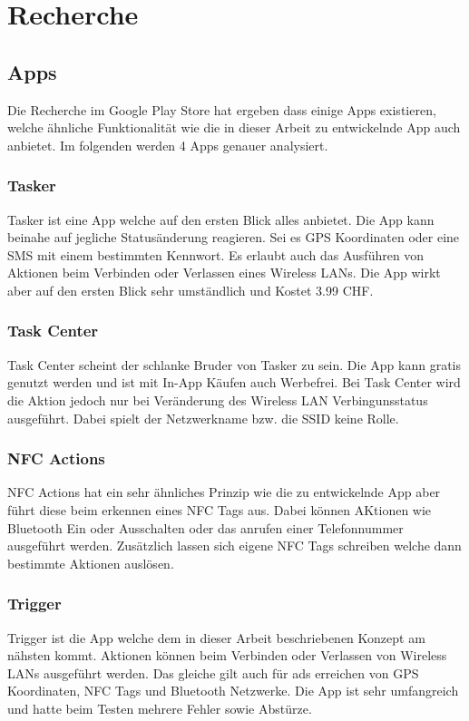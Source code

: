 \chapter{Recherche}
\label{sec:recherche}

\section{Apps}
Die Recherche im Google Play Store hat ergeben dass einige Apps existieren, welche ähnliche Funktionalität wie die in dieser Arbeit zu entwickelnde App auch anbietet. Im folgenden werden 4 Apps genauer analysiert.

\subsection{Tasker}
Tasker\citep{google.play.tasker} ist eine App welche auf den ersten Blick alles anbietet. Die App kann beinahe auf jegliche Statusänderung reagieren. Sei es GPS Koordinaten oder eine SMS mit einem bestimmten Kennwort. Es erlaubt auch das Ausführen von Aktionen beim Verbinden oder Verlassen eines Wireless LANs. Die App wirkt aber auf den ersten Blick sehr umständlich und Kostet 3.99 CHF.

\subsection{Task Center}
Task Center\citep{google.play.taskcenter} scheint der schlanke Bruder von Tasker zu sein. Die App kann gratis genutzt werden und ist mit In-App Käufen auch Werbefrei. Bei Task Center wird die Aktion jedoch nur bei Veränderung des Wireless LAN Verbingunsstatus ausgeführt. Dabei spielt der Netzwerkname bzw. die SSID keine Rolle.

\subsection{NFC Actions}
NFC Actions\citep{google.play.nfcactions} hat ein sehr ähnliches Prinzip wie die zu entwickelnde App aber führt diese beim erkennen eines NFC Tags aus. Dabei können AKtionen wie Bluetooth Ein oder Ausschalten oder das anrufen einer Telefonnummer ausgeführt werden. Zusätzlich lassen sich eigene NFC Tags schreiben welche dann bestimmte Aktionen auslösen.

\subsection{Trigger}
Trigger\citep{google.play.trigger} ist die App welche dem in dieser Arbeit beschriebenen Konzept am nähsten kommt. Aktionen können beim Verbinden oder Verlassen von Wireless LANs ausgeführt werden. Das gleiche gilt auch für ads erreichen von GPS Koordinaten, NFC Tags und Bluetooth Netzwerke. Die App ist sehr umfangreich und hatte beim Testen mehrere Fehler sowie Abstürze.

